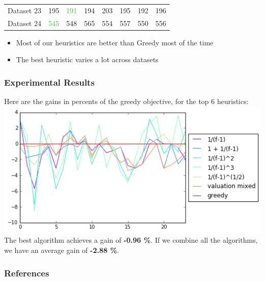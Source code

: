\documentclass[xcolor=dvipsnames]{beamer}
\begin{document}
\begin{frame}
{\begin{tabular}{*{8}{l}}
 Dataset 23& \textcolor{ProcessBlue}{195} &  \textcolor{LimeGreen}{191}  & \textcolor{ProcessBlue}{194} &  203 &  \textcolor{ProcessBlue}{195} &  \textcolor{ProcessBlue}{192} &  196 \\
 Dataset 24 & \textcolor{LimeGreen}{545}  &  \textcolor{ProcessBlue}{548} &  565  & \textcolor{ProcessBlue}{554} &  557  & \textcolor{ProcessBlue}{550}  & 556 \\
     \hline
  \end{tabular}} 
   \begin{itemize}
\item<2-> Most of our heuristics are better than Greedy most of the time
\item<3-> The best heuristic varies a lot across datasets
\end{itemize}

\end{frame}


\begin{frame}
\frametitle{Experimental Results}
Here are the gains in percents of the greedy objective, for the top 6 heuristics:
\includegraphics[width=\textwidth]{../results/heuristics_best6} \\
The best algorithm achieves a gain of \textbf{-0.96 \%}. If we combine all the algorithms, we have an average gain of \textbf{-2.88 \%}.

\end{frame}

\begin{frame}
\frametitle{References}
\end{frame}
\end{document}
